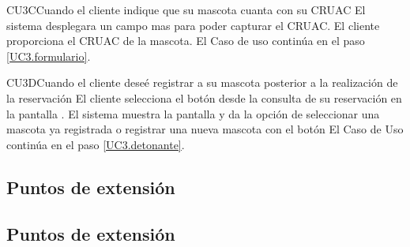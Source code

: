\begin{UCtrayectoriaA}{CU3}{C}{Cuando el cliente indique que su mascota cuanta con su CRUAC}
	\UCpaso [\UCsist]El sistema desplegara un campo mas para poder capturar el CRUAC.
	\UCpaso [\UCactor]El cliente proporciona el CRUAC de la mascota.
	\UCpaso[] El Caso de uso continúa en el paso \ref{UC3.formulario}.
\end{UCtrayectoriaA}


\begin{UCtrayectoriaA}{CU3}{D}{Cuando el cliente deseé registrar a su mascota posterior a la realización de la reservación}
	\UCpaso[\UCactor] El cliente selecciona  el botón  desde la consulta de su reservación en la pantalla .
	\UCpaso [\UCsist] El sistema muestra la pantalla   y da la opción de seleccionar una mascota ya registrada o registrar una nueva mascota con el botón 
	\UCpaso[] El Caso de Uso continúa en el paso \ref{UC3.detonante}.
\end{UCtrayectoriaA}



\subsection{Puntos de extensión}

\subsection{Puntos de extensión}




